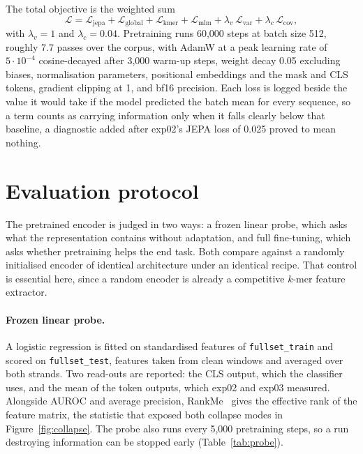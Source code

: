 \documentclass[10pt,twocolumn,a4paper]{article}
\begin{document}
The total objective is the weighted sum
\begin{equation}
\mathcal{L}=\mathcal{L}_{\text{jepa}}+\mathcal{L}_{\text{global}}
           +\mathcal{L}_{\text{kmer}}+\mathcal{L}_{\text{mlm}}
           +\lambda_{v}\,\mathcal{L}_{\text{var}}+\lambda_{c}\,\mathcal{L}_{\text{cov}},
\end{equation}
with $\lambda_v=1$ and $\lambda_c=0.04$. Pretraining runs 60{,}000 steps at batch
size 512, roughly 7.7 passes over the corpus, with AdamW at a peak learning rate
of $5\cdot10^{-4}$ cosine-decayed after 3{,}000 warm-up steps, weight decay 0.05
excluding biases, normalisation parameters, positional embeddings and the mask
and CLS tokens, gradient clipping at 1, and bf16 precision. Each loss is logged beside the value it would
take if the model predicted the batch mean for every sequence, so a term counts
as carrying information only when it falls clearly below that baseline, a
diagnostic added after exp02's JEPA loss of 0.025 proved to mean nothing.

\section{Evaluation protocol}\label{sec:eval}

The pretrained encoder is judged in two ways: a frozen linear probe, which asks
what the representation contains without adaptation, and full fine-tuning, which
asks whether pretraining helps the end task. Both compare against a randomly
initialised encoder of identical architecture under an identical recipe. That
control is essential here, since a random encoder is already a competitive
$k$-mer feature extractor.

\paragraph{Frozen linear probe.}
A logistic regression is fitted on standardised features of
\texttt{fullset\_train} and scored on \texttt{fullset\_test}, features taken from
clean windows and averaged over both strands. Two read-outs are reported: the CLS
output, which the classifier uses, and the mean of the token outputs, which exp02
and exp03 measured. Alongside AUROC and average precision,
RankMe~\cite{garrido2023rankme} gives the effective rank of the feature matrix,
the statistic that exposed both collapse modes in Figure~\ref{fig:collapse}. The
probe also runs every 5{,}000 pretraining steps, so a run destroying information
can be stopped early (Table~\ref{tab:probe}).
\end{document}
